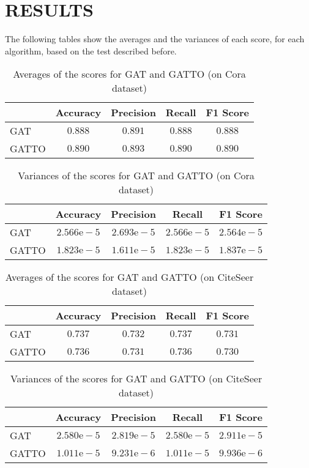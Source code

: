 \documentclass[12pt,conference]{ieeeconf} %
\begin{document}
\section{RESULTS} 
The following tables show the averages and the variances of each score, for each algorithm, based on the test described before.
\begin{table}[h!]
    \centering
    \begin{tabular}{|l|c|c|c|c|} 
    \hline
     & Accuracy & Precision & Recall & F1 Score \\ \hline
    GAT &$0.888$ &$0.891$ &$0.888$ &$0.888$ \\ \hline
    GATTO &$0.890$ &$0.893$ &$0.890$ &$0.890$\\ \hline
    \end{tabular}
    \caption{Averages of the scores for GAT and GATTO (on Cora dataset)}
\end{table}

\begin{table}[h!]
    \centering 
    \begin{tabular}{|l|c|c|c|c|} 
    \hline
     & Accuracy & Precision & Recall & F1 Score \\ \hline
    GAT &$2.566\text{e}-5$ &$2.693\text{e}-5$ &$2.566\text{e}-5$ &$2.564\text{e}-5$ \\ \hline
    GATTO &$1.823\text{e}-5$ &$1.611\text{e}-5$ &$1.823\text{e}-5$ &$1.837\text{e}-5$\\ \hline
    \end{tabular}
    \caption{Variances of the scores for GAT and GATTO (on Cora dataset)}
\end{table}

\begin{table}[h!]
    \centering
    \begin{tabular}{|l|c|c|c|c|} 
    \hline
     & Accuracy & Precision & Recall & F1 Score \\ \hline
    GAT &$0.737$ &$0.732$ &$0.737$ &$0.731$ \\ \hline
    GATTO &$0.736$ &$0.731$ &$0.736$ &$ 0.730$\\ \hline
    \end{tabular}
    \caption{Averages of the scores for GAT and GATTO (on CiteSeer dataset)}
\end{table}

\begin{table}[h!]
    \centering 
    \begin{tabular}{|l|c|c|c|c|} 
    \hline
     & Accuracy & Precision & Recall & F1 Score \\ \hline
    GAT &$2.580\text{e}-5$ &$2.819\text{e}-5$ &$2.580\text{e}-5$ &$2.911\text{e}-5$ \\ \hline
    GATTO &$1.011\text{e}-5$ &$9.231\text{e}-6$ &$1.011\text{e}-5$ &$9.936\text{e}-6$\\ \hline
    \end{tabular}
    \caption{Variances of the scores for GAT and GATTO (on CiteSeer dataset)}
\end{table}
\end{document}
